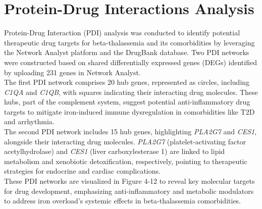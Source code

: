 \section{Protein-Drug Interactions Analysis}
\label{sec:sec4_7}

Protein-Drug Interaction (PDI) analysis was conducted to identify potential therapeutic drug targets for beta-thalassemia and its comorbidities by leveraging the Network Analyst platform and the DrugBank database. Two PDI networks were constructed based on shared differentially expressed genes (DEGs) identified by uploading 231 genes in Network Analyst. \\

The first PDI network comprises 20 hub genes, represented as circles, including \textit{C1QA} and \textit{C1QB}, with squares indicating their interacting drug molecules. These hubs, part of the complement system, suggest potential anti-inflammatory drug targets to mitigate iron-induced immune dysregulation in comorbidities like T2D and arrhythmia. \\

The second PDI network includes 15 hub genes, highlighting \textit{PLA2G7} and \textit{CES1}, alongside their interacting drug molecules. \textit{PLA2G7} (platelet-activating factor acetylhydrolase) and \textit{CES1} (liver carboxylesterase 1) are linked to lipid metabolism and xenobiotic detoxification, respectively, pointing to therapeutic strategies for endocrine and cardiac complications. \\

These PDI networks are visualized in Figure 4-12 to reveal key molecular targets for drug development, emphasizing anti-inflammatory and metabolic modulators to address iron overload's systemic effects in beta-thalassemia comorbidities. \\

